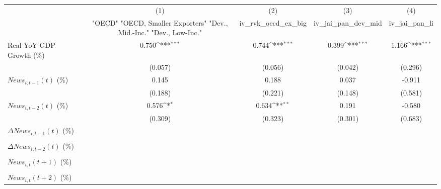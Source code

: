 {
\def\sym#1{\ifmmode^{#1}\else\(^{#1}\)\fi}
\begin{tabular}{l*{4}{c}}
\toprule
                    &\multicolumn{1}{c}{(1)}&\multicolumn{1}{c}{(2)}&\multicolumn{1}{c}{(3)}&\multicolumn{1}{c}{(4)}\\
                    &\multicolumn{1}{c}{ "OECD" "OECD, Smaller Exporters" "Dev., Mid.-Inc." "Dev., Low-Inc."}&\multicolumn{1}{c}{iv_rvk_oecd_ex_big}&\multicolumn{1}{c}{iv_jai_pan_dev_mid}&\multicolumn{1}{c}{iv_jai_pan_li}\\
\midrule
Real YoY GDP Growth (\%)&       0.750\sym{***}&       0.744\sym{***}&       0.399\sym{***}&       1.166\sym{***}\\
                    &     (0.057)         &     (0.056)         &     (0.042)         &     (0.296)         \\
\addlinespace
$ News_{i,t-1}(t)$ (\%)&       0.145         &       0.188         &       0.037         &      -0.911         \\
                    &     (0.188)         &     (0.221)         &     (0.148)         &     (0.581)         \\
\addlinespace
$ News_{i,t-2}(t)$ (\%)&       0.576\sym{*}  &       0.634\sym{**} &       0.191         &      -0.580         \\
                    &     (0.309)         &     (0.323)         &     (0.301)         &     (0.683)         \\
\addlinespace
$ \Delta News_{i,t-1}(t)$ (\%)&                     &                     &                     &                     \\
                    &                     &                     &                     &                     \\
\addlinespace
$ \Delta News_{i,t-2}(t)$ (\%)&                     &                     &                     &                     \\
                    &                     &                     &                     &                     \\
\addlinespace
$ News_{i,t}(t+1)$ (\%)&                     &                     &                     &                     \\
                    &                     &                     &                     &                     \\
\addlinespace
$ News_{i,t}(t+2)$ (\%)&                     &                     &                     &                     \\

\end{tabular}}
